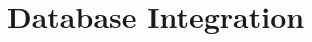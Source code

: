 \documentclass[conference]{IEEEtran}
\begin{document}

\section{Database Integration}
\end{document}
